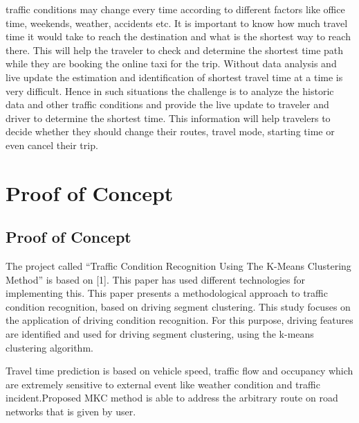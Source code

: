 \documentclass[12pt,report]{ucdavisthesis}
\begin{document}
    traffic conditions may change every time according to different factors like office
    time, weekends, weather, accidents etc. It is important to know how much travel
    time it would take to reach the destination and what is the shortest way to reach
    there. This will help the traveler to check and determine the shortest time path while
    they are booking the online taxi for the trip. Without data analysis and live update
    the estimation and identification of shortest travel time at a time is very difficult.
    Hence in such situations the challenge is to analyze the historic data and other traffic
    conditions and provide the live update to traveler and driver to determine the shortest
    time. This information will help travelers to decide whether they should change
    their routes, travel mode, starting time or even cancel their trip.%
    \chapter{Proof of Concept}\label{chp:chapter}
    \section{Proof of Concept}
    \hspace{2cm}The project called “Traffic Condition Recognition Using The K-Means
    Clustering Method” is based on [1]. This  paper has used different technologies for implementing this. This paper presents a methodological approach to traffic condition recognition, based on
    driving segment clustering. This study focuses on the application of driving condition recognition. For this purpose, driving features
    are identified and used for driving segment clustering, using the k-means clustering algorithm. \par\hspace{2cm}Travel time prediction is based on vehicle speed, traffic flow and occupancy which 
    are extremely sensitive to external event like weather condition and traffic incident.\newline Proposed MKC method is able to address the arbitrary route on road networks that is given by user. 
   
\end{document}
